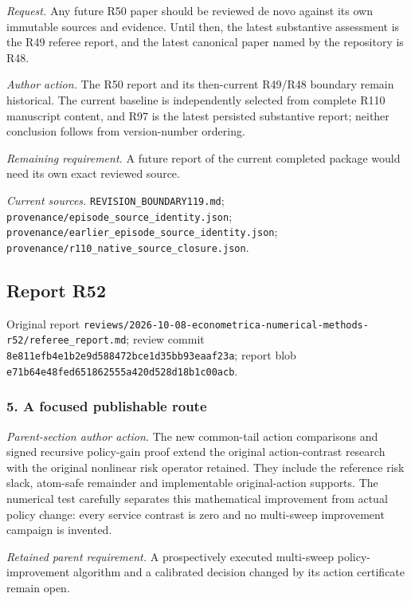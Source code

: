 \par\emph{Request.} Any future R50 paper should be reviewed de novo against its own immutable sources and evidence. Until then, the latest substantive assessment is the R49 referee report, and the latest canonical paper named by the repository is R48.

\par\emph{Author action.} The R50 report and its then-current R49/R48 boundary remain historical. The current baseline is independently selected from complete R110 manuscript content, and R97 is the latest persisted substantive report; neither conclusion follows from version-number ordering.

\par\emph{Remaining requirement.} A future report of the current completed package would need its own exact reviewed source.

\par\emph{Current sources.} \nolinkurl{REVISION_BOUNDARY119.md}; \nolinkurl{provenance/episode_source_identity.json}; \nolinkurl{provenance/earlier_episode_source_identity.json}; \nolinkurl{provenance/r110_native_source_closure.json}.

\subsection{Report R52}

Original report \nolinkurl{reviews/2026-10-08-econometrica-numerical-methods-r52/referee_report.md}; review commit \nolinkurl{8e811efb4e1b2e9d588472bce1d35bb93eaaf23a}; report blob \nolinkurl{e71b64e48fed651862555a420d528d18b1c00acb}.

\subsubsection{5. A focused publishable route}

\emph{Parent-section author action.} The new common-tail action comparisons and signed recursive policy-gain proof extend the original action-contrast research with the original nonlinear risk operator retained. They include the reference risk slack, atom-safe remainder and implementable original-action supports. The numerical test carefully separates this mathematical improvement from actual policy change: every service contrast is zero and no multi-sweep improvement campaign is invented.

\par\emph{Retained parent requirement.} A prospectively executed multi-sweep policy-improvement algorithm and a calibrated decision changed by its action certificate remain open.

